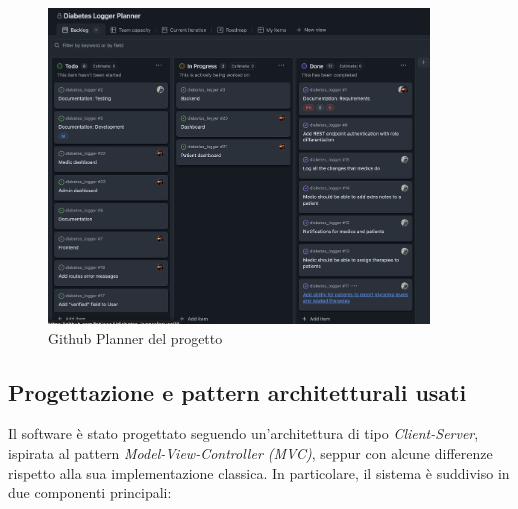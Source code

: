 \documentclass[a4paper]{article}
\begin{document}
\begin{figure}[H]
  \begin{center}
    \includegraphics[width=0.9\textwidth]{githubPlanner.png}
  \end{center}
  \caption{Github Planner del progetto} 
  \label{fig:githubPlanner}
\end{figure}

\subsection{Progettazione e pattern architetturali usati}

Il software è stato progettato seguendo un’architettura di tipo \textit{Client-Server}, 
ispirata al pattern \textit{Model-View-Controller (MVC)}, 
seppur con alcune differenze rispetto alla sua implementazione classica.
 In particolare, il sistema è suddiviso in due componenti principali:
\end{document}

